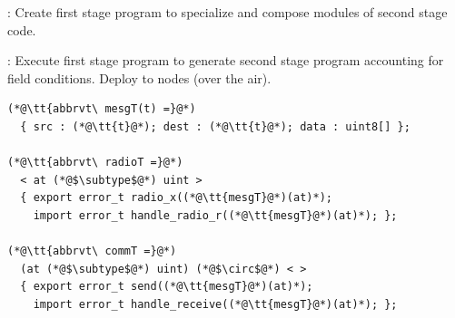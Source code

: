 \centering
{}
\begin{citemize}
\item {}: Create first stage program to specialize and compose modules of second
  stage code.
\item {}: Execute first stage program to generate second stage program
  accounting for field conditions. Deploy to nodes (over the air).
\end{citemize}
\stopslide

%
%

\begin{lstlisting}[language=nesC]
(*@\tt{abbrvt\ mesgT(t) =}@*)
  { src : (*@\tt{t}@*); dest : (*@\tt{t}@*); data : uint8[] };

(*@\tt{abbrvt\ radioT =}@*)
  < at (*@$\subtype$@*) uint >
  { export error_t radio_x((*@\tt{mesgT}@*)(at)*); 
    import error_t handle_radio_r((*@\tt{mesgT}@*)(at)*); };

(*@\tt{abbrvt\ commT =}@*)
  (at (*@$\subtype$@*) uint) (*@$\circ$@*) < >
  { export error_t send((*@\tt{mesgT}@*)(at)*); 
    import error_t handle_receive((*@\tt{mesgT}@*)(at)*); };
\end{lstlisting}
\stopslide

